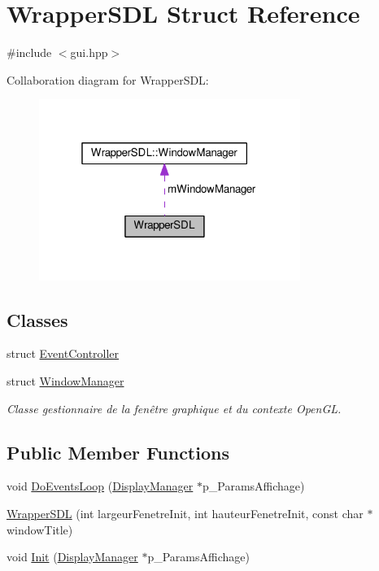 \hypertarget{struct_wrapper_s_d_l}{\section{Wrapper\+S\+D\+L Struct Reference}
\label{struct_wrapper_s_d_l}
}


{\ttfamily \#include $<$gui.\+hpp$>$}



Collaboration diagram for Wrapper\+S\+D\+L\+:
\nopagebreak
\begin{figure}[H]
\begin{center}
\leavevmode
\includegraphics[width=241pt]{struct_wrapper_s_d_l__coll__graph}
\end{center}
\end{figure}
\subsection*{Classes}
\begin{DoxyCompactItemize}
\item 
struct \hyperlink{struct_wrapper_s_d_l_1_1_event_controller}{Event\+Controller}
\item 
struct \hyperlink{struct_wrapper_s_d_l_1_1_window_manager}{Window\+Manager}
\begin{DoxyCompactList}\small\item\em Classe gestionnaire de la fenêtre graphique et du contexte Open\+G\+L. \end{DoxyCompactList}\end{DoxyCompactItemize}
\subsection*{Public Member Functions}
\begin{DoxyCompactItemize}
\item 
void \hyperlink{struct_wrapper_s_d_l_a22e3212f89893ca93010a76df861726b}{Do\+Events\+Loop} (\hyperlink{class_display_manager}{Display\+Manager} $\ast$p\+\_\+\+Params\+Affichage)
\item 
\hyperlink{struct_wrapper_s_d_l_ae0484ea23c2afaae3cdc6ec0a425bdeb}{Wrapper\+S\+D\+L} (int largeur\+Fenetre\+Init, int hauteur\+Fenetre\+Init, const char $\ast$window\+Title)
\item 
void \hyperlink{struct_wrapper_s_d_l_a6731fd378a5431029257edae59bbb6d1}{Init} (\hyperlink{class_display_manager}{Display\+Manager} $\ast$p\+\_\+\+Params\+Affichage)
\end{DoxyCompactItemize}
